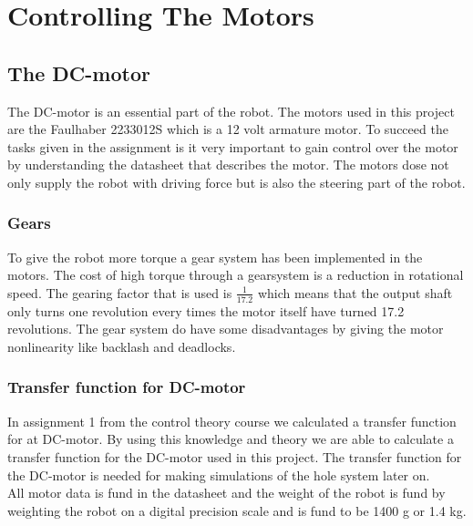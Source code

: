 \chapter{Controlling The Motors}
\label{ch:motors}


\section {The DC-motor}

The DC-motor is an essential part of the robot. The motors used in this project are the Faulhaber 2233012S which is a 12 volt armature motor.  To succeed the tasks given in the assignment is it very important to gain control over the motor by understanding the datasheet that describes the motor. The motors dose not only supply the robot with driving force but is also the steering part of the robot.

\subsection{Gears}
To give the robot more torque a gear system has been implemented in the motors. The cost of high torque through a gearsystem is a reduction in rotational speed. The gearing factor that is used is $\frac{1}{17.2}$ which means that the output shaft only turns one revolution every times the motor itself have turned 17.2 revolutions. The gear system do have some disadvantages by giving the motor nonlinearity like backlash and deadlocks. 

\subsection{Transfer function for DC-motor}
In assignment 1 from the control theory course we calculated a transfer function for at DC-motor. By using this knowledge and theory we are able to calculate a transfer function for the DC-motor used in this project.
The transfer function for the DC-motor is needed for making simulations of the hole system later on.\\
All motor data is fund in the datasheet and the weight of the robot is fund by weighting the robot on a digital precision scale and is fund to be 1400 g or 1.4 kg. \\

